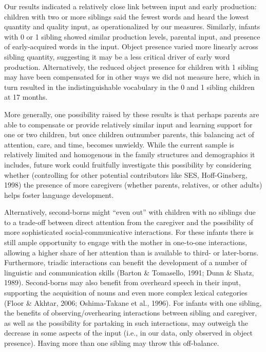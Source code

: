 \documentclass[
  english,
  man,floatsintext]{apa6}
\begin{document}
Our results indicated a relatively close link between input and early production: children with two or more siblings said the fewest words and heard the lowest quantity and quality input, as operationalized by our measures. Similarly, infants with 0 or 1 sibling showed similar production levels, parental input, and presence of early-acquired words in the input. Object presence varied more linearly across sibling quantity, suggesting it may be a less critical driver of early word production. Alternatively, the reduced object presence for children with 1 sibling may have been compensated for in other ways we did not measure here, which in turn resulted in the indistinguishable vocabulary in the 0 and 1 sibling children at 17 months.

More generally, one possibility raised by these results is that perhaps parents are able to compensate or provide relatively similar input and learning support for one or two children, but once children outnumber parents, this balancing act of attention, care, and time, becomes unwieldy. While the current sample is relatively limited and homogenous in the family structures and demographics it includes, future work could fruitfully investigate this possibility by considering whether (controlling for other potential contributors like SES, Hoff-Ginsberg, 1998) the presence of more caregivers (whether parents, relatives, or other adults) helps foster language development.

Alternatively, second-borns might \enquote{even out} with children with no siblings due to a trade-off between direct attention from the caregiver and the possibility of more sophisticated social-communicative interactions. For these infants there is still ample opportunity to engage with the mother in one-to-one interactions, allowing a higher share of her attention than is available to third- or later-borns. Furthermore, triadic interactions can benefit the development of a number of linguistic and communication skills (Barton \& Tomasello, 1991; Dunn \& Shatz, 1989). Second-borns may also benefit from overheard speech in their input, supporting the acquisition of nouns and even more complex lexical categories (Floor \& Akhtar, 2006; Oshima-Takane et al., 1996). For infants with one sibling, the benefits of observing/overhearing interactions between sibling and caregiver, as well as the possibility for partaking in such interactions, may outweigh the decrease in some aspects of the input (i.e., in our data, only observed in object presence). Having more than one sibling may throw this off-balance.
\end{document}
